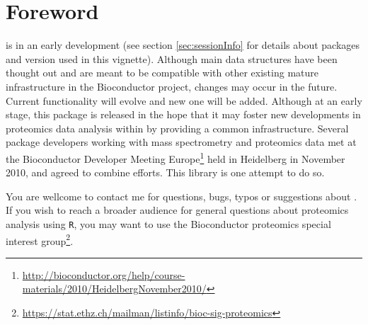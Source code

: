 \section*{Foreword}

 is in an early development %
(see section \ref{sec:sessionInfo} for details about packages and version used in this vignette). 
Although main data structures have been thought out and are meant to be compatible with other existing 
mature infrastructure in the Bioconductor project, changes may occur in the future. 
Current functionality will evolve and new one will be added. 
Although at an early stage, this package is released in the hope that it may foster  
new developments in proteomics data analysis within \R by providing a common infrastructure. 
Several package developers working with mass spectrometry and proteomics data met at the 
Bioconductor Developer Meeting Europe\footnote{\url{http://bioconductor.org/help/course-materials/2010/HeidelbergNovember2010/}} 
held in Heidelberg in November 2010, and agreed to combine efforts. 
This library is one attempt to do so.

\bigskip

You are wellcome to contact me for questions, bugs, typos or suggestions about . 
If you wish to reach a broader audience for general questions about proteomics analysis using \texttt{R}, 
you may want to use the Bioconductor proteomics special interest 
group\footnote{\url{https://stat.ethz.ch/mailman/listinfo/bioc-sig-proteomics}}. 
